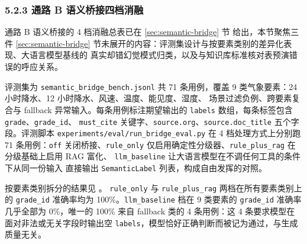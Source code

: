 
\subsubsection*{5.2.3 \quad 通路 B 语义桥接四档消融}
\label{sec:bridge-eval}

通路 B 语义桥接的 4 档消融总表已在 \ref{sec:semantic-bridge} 节
 给出，本节聚焦三件 \ref{sec:semantic-bridge}
节未展开的内容：评测集设计与按要素类别的差异化表现、大语言模型基线的
真实却错幻觉模式归类，以及与知识库标准核对表预演错误的呼应关系。

评测集为 \texttt{semantic\_\bk{}bridge\_\bk{}bench.\bk{}jsonl} 共 71 条用例，覆盖
9 类气象要素：24 小时降水、12 小时降水、风速、温度、能见度、湿度、
场景过滤负例、跨要素复合与 fallback 异常输入。每条用例标注期望输出的
\texttt{labels} 数组，每条标签包含 \texttt{grade}、\texttt{grade\_\bk{}id}、
\texttt{must\_\bk{}cite} 关键字、\texttt{source.\bk{}org}、\texttt{source.\bk{}doc\_\bk{}title}
五个字段。评测脚本 \texttt{experiments/\bk{}eval/\bk{}run\_\bk{}bridge\_\bk{}eval.\bk{}py} 在
4 档处理方式上分别跑 71 条用例：\texttt{off} 关闭桥接、\texttt{rule\_\bk{}only}
仅启用确定性分级器、\texttt{rule\_\bk{}plus\_\bk{}rag} 在分级基础上启用 RAG 富化、
\texttt{llm\_\bk{}baseline} 让大语言模型在不调任何工具的条件下从同一份输入
直接输出 \texttt{SemanticLabel} 列表，构成自由发挥的对照。

按要素类别拆分的结果见 。
\texttt{rule\_\bk{}only} 与 \texttt{rule\_\bk{}plus\_\bk{}rag} 两档在所有要素类别上的
\texttt{grade\_\bk{}id} 准确率均为 100\%。\texttt{llm\_\bk{}baseline} 档在
9 类要素的 \texttt{grade\_\bk{}id} 准确率几乎全部为 0\%，唯一的 100\% 来自
fallback 类的 4 条用例：这 4 条要求模型在面对非法或无关字段时输出空
\texttt{labels}，模型恰好正确判断而被记为通过，与生成质量无关。

